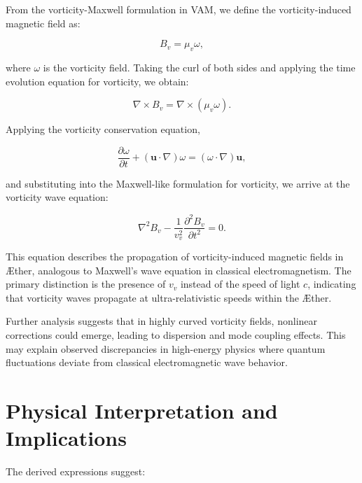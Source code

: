 \documentclass[a4paper,10pt]{article}
\begin{document}
From the vorticity-Maxwell formulation in VAM, we define the vorticity-induced magnetic field as:

\begin{equation*}
    B_v = \mu_v \omega,
\end{equation*}

where $\omega$ is the vorticity field. Taking the curl of both sides and applying the time evolution equation for vorticity, we obtain:

\begin{equation*}
    \nabla \times B_v = \nabla \times (\mu_v \omega).
\end{equation*}

Applying the vorticity conservation equation,

\begin{equation*}
    \frac{\partial \omega}{\partial t} + (\boldsymbol{u} \cdot \nabla) \omega = (\omega \cdot \nabla) \boldsymbol{u},
\end{equation*}

and substituting into the Maxwell-like formulation for vorticity, we arrive at the vorticity wave equation:

\begin{equation*}
    \nabla^2 B_v - \frac{1}{v_v^2} \frac{\partial^2 B_v}{
        \partial t^2} = 0.
\end{equation*}

This equation describes the propagation of vorticity-induced magnetic fields in Æther, analogous to Maxwell's wave equation in classical electromagnetism. The primary distinction is the presence of $v_v$ instead of the speed of light $c$, indicating that vorticity waves propagate at ultra-relativistic speeds within the Æther.

Further analysis suggests that in highly curved vorticity fields, nonlinear corrections could emerge, leading to dispersion and mode coupling effects. This may explain observed discrepancies in high-energy physics where quantum fluctuations deviate from classical electromagnetic wave behavior.

\section{Physical Interpretation and Implications}

The derived expressions suggest:
\end{document}
